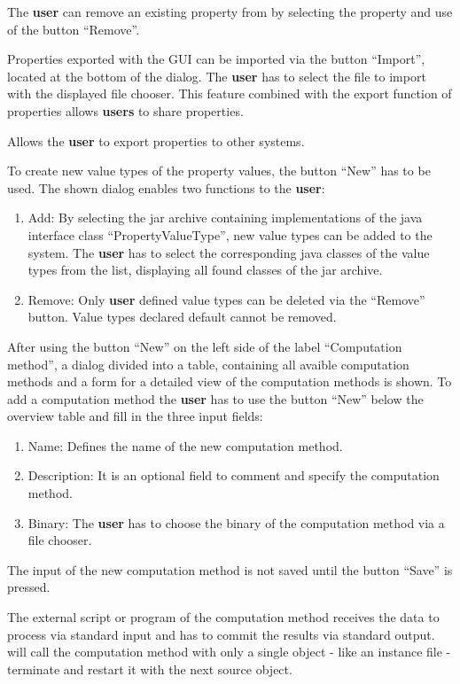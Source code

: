 The \textbf{user} can remove an existing property from \edacc by  selecting the property and use of the button ``Remove''.

Properties exported with the GUI can be imported via the button ``Import'', located at the bottom of the dialog. The \textbf{user} has to select the file to import with the displayed file chooser. This feature combined with the export function of properties allows \textbf{users} to share properties.

Allows the \textbf{user} to export properties to other \edacc systems.

\label{definePropertyValuetype}
To create new value types of the property values, the button ``New'' has to be used. The shown dialog enables two functions to the \textbf{user}:
\begin{enumerate}
	\item Add: By selecting the jar archive containing implementations of the java interface class ``PropertyValueType'', new value types can be added to the \edacc system. The \textbf{user} has to select the corresponding java classes of the value types from the list, displaying all found classes of the jar archive.
	\item Remove: Only \textbf{user} defined value types can be deleted via the ``Remove'' button. Value types declared default cannot be removed.
\end{enumerate}

After using the button ``New'' on the left side of the label ``Computation method'', a dialog divided into a table, containing all avaible computation methods and a form for a detailed view of the computation methods is shown. To add a computation method the \textbf{user} has to use the button ``New'' below the overview table and fill in the three input fields:
\begin{enumerate}
	\item Name: Defines the name of the new computation method.
	\item Description: It is an optional field to comment and specify the computation method.
	\item Binary: The \textbf{user} has to choose the binary of the computation method via a file chooser.
\end{enumerate}
\attention The input of the new computation method is not saved until the button ``Save'' is pressed. 

\attention The external script or program of the computation method receives the data to process via standard input  and has to commit the results via standard output. \edacc will call the computation method with only a single object - like an instance file - terminate and restart it with the next source object.